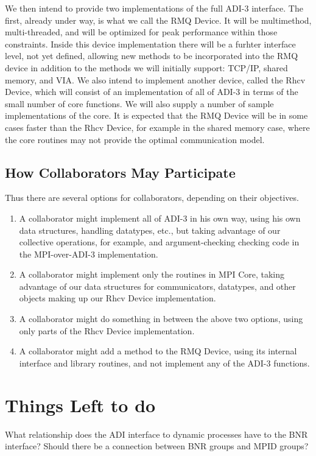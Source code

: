 \documentclass{article}
\begin{document}
We then intend to provide two implementations of the full ADI-3 interface.
The first, already under way, is what we call the RMQ Device.  It will be 
multimethod, multi-threaded, and will be optimized for peak performance within
those constraints.  Inside this device implementation there will be a furhter
interface level, not yet defined, allowing new methods to be incorporated into
the RMQ device in addition to the methods we will initially support:  TCP/IP,
shared memory, and VIA.  We also intend to implement another device, called 
the Rhcv Device, which will consist of an implementation of all of ADI-3 in
terms of the small number of core functions.  We will also supply a number of
sample implementations of the core.  It is expected that the RMQ Device will
be in some cases faster than the Rhcv Device, for example in the shared
memory case, where the core routines may not provide the optimal communication
model. 


\subsection{How Collaborators May Participate}
\label{sec:collaborators}

Thus there are several options for collaborators, depending on their
objectives.
\begin{enumerate}
\item A collaborator might implement all of ADI-3 in his own way, using his
  own data structures, handling datatypes, etc., but taking advantage of our
  collective operations, for example, and argument-checking checking code in
  the MPI-over-ADI-3 implementation.
\item A collaborator might implement only the routines in MPI Core, taking
  advantage of our data structures for communicators, datatypes, and other
  objects making up our Rhcv Device implementation.
\item A collaborator might do something in between the above two options,
  using only parts of the Rhcv Device implementation.
\item A collaborator might add a method to the RMQ Device, using its internal
  interface and library routines, and not implement any of the ADI-3 functions.
\end{enumerate}

\section{Things Left to do}
What relationship does the ADI interface to dynamic processes 
have to the BNR interface?  Should there be a connection between BNR groups
and MPID groups?
\end{document}
